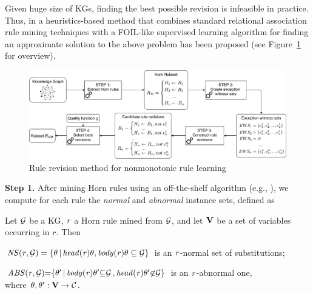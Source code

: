 

Given huge size of KGs, finding the best possible revision is infeasible in practice. Thus, in \cite{gad2016,rumis} a heuristics-based method that combines standard relational association rule mining techniques with a FOIL-like supervised learning algorithm \cite{foil} for finding an approximate solution to the above problem has been proposed (see Figure~\ref{fig:iswc_process} for overview). 

\begin{figure}[t]
\centering
\includegraphics[width=1\textwidth]{figures/overview_new}
\caption{Rule revision method for nonmonotonic rule learning~\cite{gad2016,rumis}}
\label{fig:iswc_process}
\end{figure}
\noindent \textbf{Step 1.} After mining Horn rules using an off-the-shelf algorithm (e.g.,
 \cite{amie}), %
 we compute for each rule the \emph{normal} and
\emph{abnormal} instance sets, defined as

\begin{definition}\label{sec:rulelearn}
Let $\mathcal{G}$ be a KG, $\mathit{r}$ a Horn rule mined from $\mathcal{G}$, and let ${\mathbf V}$ be a set of variables occurring in $r$. Then
\begin{myitemize}
\item $\mathit{NS(r, \mathcal{G})=\{\theta\, |\, head(r)\theta,body(r)\theta \subseteq \mathcal{G}\}}$ is an $\mathit{r}$-normal set of substitutions;
\item $\mathit{ABS(r, \mathcal{G}){=}\{\theta'\, |\, body(r)\theta' {\subseteq} \mathcal{G}\,{,}\,head(r)\theta' {\not \in} \mathcal{G}\}}$ is an $\mathit{r}$-abnormal one, \\
where $\theta,\theta':{\mathbf V} \rightarrow \mathcal{C}$.
\end{myitemize} 
\end{definition}

